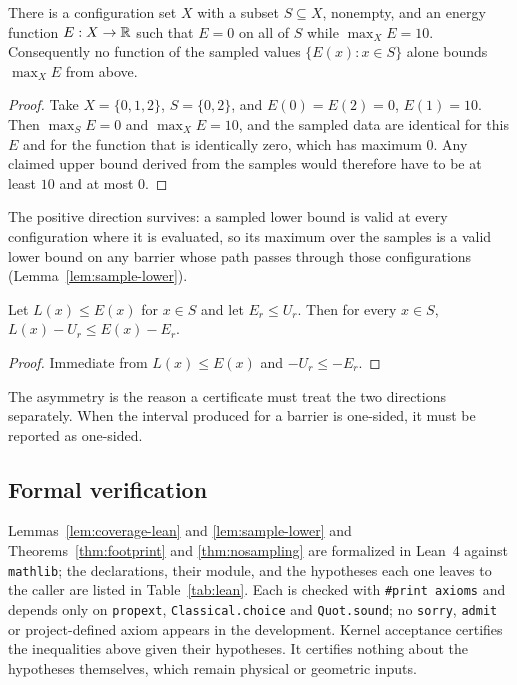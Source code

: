 \begin{theorem}
\label{thm:nosampling}
There is a configuration set $X$ with a subset $S\subseteq X$, nonempty, and an
energy function $E:X\to\mathbb{R}$ such that $E=0$ on all of $S$ while
$\max_X E = 10$. Consequently no function of the sampled values
$\{E(x):x\in S\}$ alone bounds $\max_X E$ from above.
\end{theorem}
\begin{proof}
Take $X=\{0,1,2\}$, $S=\{0,2\}$, and $E(0)=E(2)=0$, $E(1)=10$. Then
$\max_S E = 0$ and $\max_X E = 10$, and the sampled data are identical for this
$E$ and for the function that is identically zero, which has maximum $0$. Any
claimed upper bound derived from the samples would therefore have to be at
least $10$ and at most $0$.
\end{proof}

The positive direction survives: a sampled lower bound is valid at every
configuration where it is evaluated, so its maximum over the samples is a valid
lower bound on any barrier whose path passes through those configurations
(Lemma~\ref{lem:sample-lower}).

\begin{lemma}
\label{lem:sample-lower}
Let $L(x)\le E(x)$ for $x\in S$ and let $E_r\le U_r$. Then for every $x\in S$,
$L(x)-U_r \le E(x)-E_r$.
\end{lemma}
\begin{proof}
Immediate from $L(x)\le E(x)$ and $-U_r\le-E_r$.
\end{proof}

The asymmetry is the reason a certificate must treat the two directions
separately. When the interval produced for a barrier is one-sided, it must be
reported as one-sided.

\subsection{Formal verification}

Lemmas~\ref{lem:coverage-lean} and \ref{lem:sample-lower} and
Theorems~\ref{thm:footprint} and \ref{thm:nosampling} are formalized in Lean~4
against \texttt{mathlib}; the declarations, their module, and the hypotheses
each one leaves to the caller are listed in Table~\ref{tab:lean}. Each is
checked with \texttt{\#print axioms} and depends only on \texttt{propext},
\texttt{Classical.choice} and \texttt{Quot.sound}; no \texttt{sorry},
\texttt{admit} or project-defined axiom appears in the development. Kernel
acceptance certifies the inequalities above given their hypotheses. It
certifies nothing about the hypotheses themselves, which remain physical or
geometric inputs.

